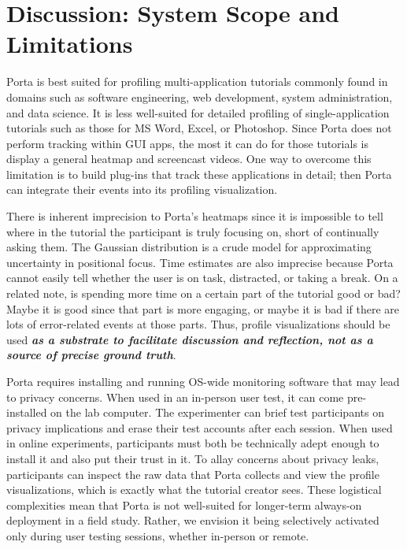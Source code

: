 \section{Discussion: System Scope and Limitations}

Porta is best suited for profiling multi-application tutorials commonly
found in domains such as software engineering, web development, system
administration, and data science. It is less well-suited for detailed
profiling of single-application tutorials such as those for MS Word,
Excel, or Photoshop. Since Porta does not perform tracking within GUI
apps, the most it can do for those tutorials is display a general
heatmap and screencast videos.
%
One way to overcome this limitation is to build plug-ins that track
these applications in detail; then Porta can integrate their events into
its profiling visualization.

There is inherent imprecision to Porta's heatmaps since it is impossible
to tell where in the tutorial the participant is truly focusing on,
short of continually asking them. The Gaussian distribution is a crude
model for approximating uncertainty in positional focus. Time estimates
are also imprecise because Porta cannot easily tell whether the user is
on task, distracted, or taking a break.
%
%
On a related note, is spending more time on a certain part of the
tutorial good or bad? Maybe it is good since that part is more engaging,
or maybe it is bad if there are lots of error-related events at those
parts. Thus, profile visualizations should be used \textbf{\emph{as a
substrate to facilitate discussion and reflection, not as a source of
precise ground truth}}.

Porta requires installing and running OS-wide monitoring software that
may lead to privacy concerns. When used in an in-person user test, it
can come pre-installed on the lab computer. The experimenter can brief
test participants on privacy implications and erase their test accounts
after each session. When used in online experiments, participants must
both be technically adept enough to install it and also put their trust
in it. To allay concerns about privacy leaks, participants can inspect
the raw data that Porta collects and view the profile visualizations,
which is exactly what the tutorial creator sees.
%
These logistical complexities mean that Porta is not well-suited for
longer-term always-on deployment in a field study. Rather, we envision it
being selectively activated only during user testing sessions, whether
in-person or remote.

